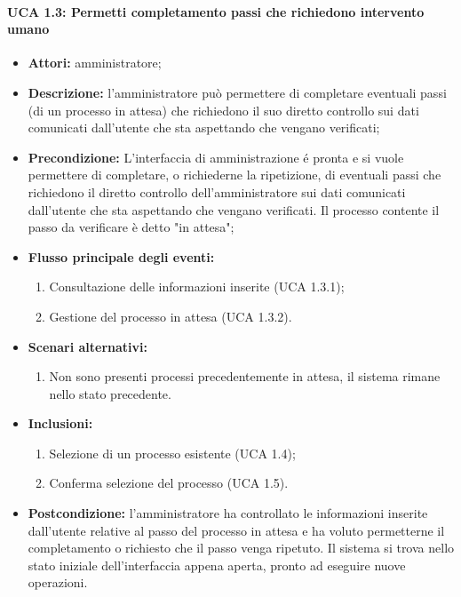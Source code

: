 \paragraph{UCA 1.3: Permetti completamento passi che richiedono intervento umano}
\begin{itemize}
\item \textbf{Attori:} 
amministratore;
\item \textbf{Descrizione:} 
l'amministratore può permettere di completare eventuali passi (di un processo in attesa) che richiedono il suo diretto controllo sui dati comunicati dall'utente che sta aspettando che vengano verificati;
\item \textbf{Precondizione:} 
L'interfaccia di amministrazione é pronta e si vuole permettere di completare, o richiederne la ripetizione, di eventuali passi che richiedono il diretto controllo dell'amministratore sui dati comunicati dall'utente che sta aspettando che vengano verificati. Il processo contente il passo da verificare è detto "in attesa";
\item \textbf{Flusso principale degli eventi:} 
\begin{enumerate}
\item Consultazione delle informazioni inserite (UCA 1.3.1);
\item Gestione del processo in attesa (UCA 1.3.2).
\end{enumerate}
\item \textbf{Scenari alternativi:}
\begin{enumerate}
\item Non sono presenti processi precedentemente in attesa, il sistema rimane nello stato precedente.
\end{enumerate}
\item \textbf{Inclusioni:}
\begin{enumerate}
\item Selezione di un processo esistente (UCA 1.4);
\item Conferma selezione del processo (UCA 1.5).
\end{enumerate}
\item \textbf{Postcondizione:} 
l'amministratore ha controllato le informazioni inserite dall'utente relative al passo del processo in attesa e ha voluto permetterne il completamento o richiesto che il passo venga ripetuto. Il sistema si trova nello stato iniziale dell'interfaccia appena aperta, pronto ad eseguire nuove operazioni.
\end{itemize}

